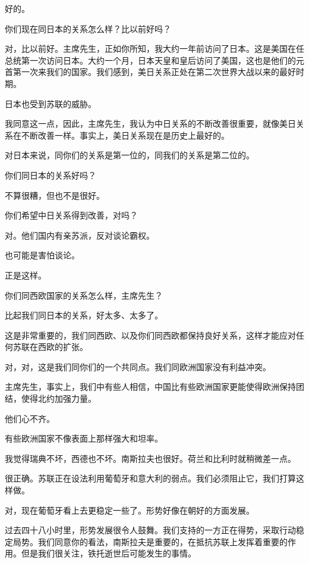 好的。

你们现在同日本的关系怎么样？比以前好吗？

对，比以前好。主席先生，正如你所知，我大约一年前访问了日本。这是美国在任总统第一次访问日本。大约一个月，日本天皇和皇后访问了美国，这也是他们的元首第一次来我们的国家。我们感到，美日关系正处在第二次世界大战以来的最好时期。

日本也受到苏联的威胁。

我同意这一点，因此，主席先生，我认为中日关系的不断改善很重要，就像美日关系在不断改善一样。事实上，美日关系现在是历史上最好的。

对日本来说，同你们的关系是第一位的，同我们的关系是第二位的。

你们同日本的关系好吗？

不算很糟，但也不是很好。

你们希望中日关系得到改善，对吗？

对。他们国内有亲苏派，反对谈论霸权。

也可能是害怕谈论。

正是这样。

你们同西欧国家的关系怎么样，主席先生？

比起我们同日本的关系，好太多、太多了。

这是非常重要的，我们同西欧、以及你们同西欧都保持良好关系，这样才能应对任何苏联在西欧的扩张。

对，对，这是我们同你们的一个共同点。我们同欧洲国家没有利益冲突。

主席先生，事实上，我们中有些人相信，中国比有些欧洲国家更能使得欧洲保持团结，使得北约加强力量。

他们心不齐。

有些欧洲国家不像表面上那样强大和坦率。

我觉得瑞典不坏，西德也不坏。南斯拉夫也很好。荷兰和比利时就稍微差一点。

很正确。苏联正在设法利用葡萄牙和意大利的弱点。我们必须阻止它，我们打算这样做。

对，现在葡萄牙看上去更稳定一些了。形势好像在朝好的方面发展。

过去四十八小时里，形势发展很令人鼓舞。我们支持的一方正在得势，采取行动稳定局势。我们同意你的看法，南斯拉夫是重要的，在抵抗苏联上发挥着重要的作用。但是我们很关注，铁托逝世后可能发生的事情。

